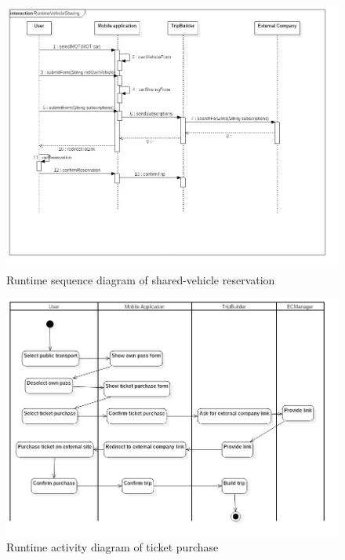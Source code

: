 \documentclass[a4paper,leqno]{article}
\begin{document}
\begin{figure}[!h]
	\centering
	\begin{center}
		\includegraphics[scale=0.3,]{RuntimeVehicleSharing_191117_1}
	\end{center}
	\caption{Runtime sequence diagram of shared-vehicle reservation}
\end{figure}
\begin{figure}[!h]
	\centering
	\begin{center}
		\includegraphics[scale=0.3]{TicketPurchaseActivity_241117_1}
	\end{center}
	\caption{Runtime activity diagram of ticket purchase}
\end{figure}
\end{document}
